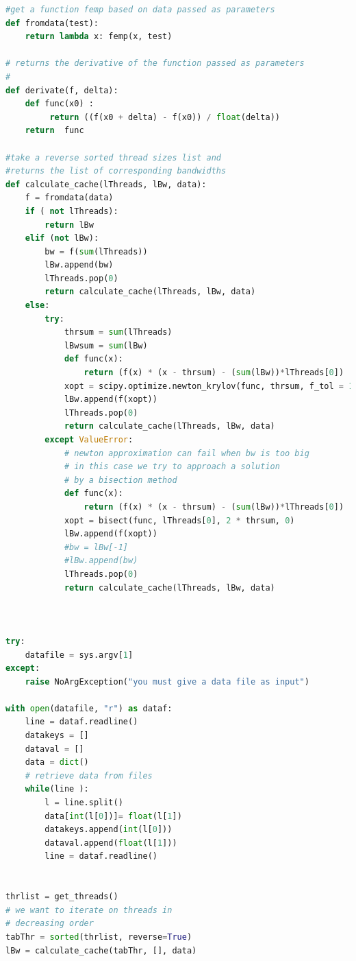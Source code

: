 \documentclass{report}
\begin{document}
\begin{appendices}
\begin{lstlisting}[language=python]
#get a function femp based on data passed as parameters
def fromdata(test):
    return lambda x: femp(x, test)

# returns the derivative of the function passed as parameters
# 
def derivate(f, delta):
    def func(x0) :  
         return ((f(x0 + delta) - f(x0)) / float(delta))
    return  func

#take a reverse sorted thread sizes list and 
#returns the list of corresponding bandwidths
def calculate_cache(lThreads, lBw, data):
    f = fromdata(data)
    if ( not lThreads):
        return lBw
    elif (not lBw):
        bw = f(sum(lThreads))
        lBw.append(bw)
        lThreads.pop(0)
        return calculate_cache(lThreads, lBw, data)
    else:
        try:
            thrsum = sum(lThreads)
            lBwsum = sum(lBw)
            def func(x):
                return (f(x) * (x - thrsum) - (sum(lBw))*lThreads[0])
            xopt = scipy.optimize.newton_krylov(func, thrsum, f_tol = 1.0)
            lBw.append(f(xopt))
            lThreads.pop(0)
            return calculate_cache(lThreads, lBw, data)
        except ValueError:
            # newton approximation can fail when bw is too big
            # in this case we try to approach a solution
            # by a bisection method
            def func(x):
                return (f(x) * (x - thrsum) - (sum(lBw))*lThreads[0])
            xopt = bisect(func, lThreads[0], 2 * thrsum, 0)
            lBw.append(f(xopt))
            #bw = lBw[-1]
            #lBw.append(bw)
            lThreads.pop(0)
            return calculate_cache(lThreads, lBw, data)



try:
    datafile = sys.argv[1]
except:
    raise NoArgException("you must give a data file as input")

with open(datafile, "r") as dataf:
    line = dataf.readline()
    datakeys = []
    dataval = []
    data = dict()
    # retrieve data from files
    while(line ):
        l = line.split()
        data[int(l[0])]= float(l[1])
        datakeys.append(int(l[0]))
        dataval.append(float(l[1]))
        line = dataf.readline()


thrlist = get_threads()
# we want to iterate on threads in
# decreasing order 
tabThr = sorted(thrlist, reverse=True)
lBw = calculate_cache(tabThr, [], data)
\end{lstlisting}
\end{appendices}
\end{document}
